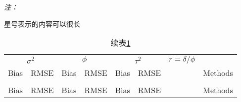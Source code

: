 \documentclass[
]{ctexbook}
\begin{document}
\begin{ThreePartTable}
\begin{TableNotes}
\item \textit{注：} 
\item * 星号表示的内容可以很长
\end{TableNotes}
\begin{longtable}[t]{rrrrrrrl}
\caption{\label{tab:kableExtra-latex}第1种类型的统计表格样式}\\
\toprule
\multicolumn{2}{c}{$\sigma^2$} & \multicolumn{2}{c}{$\phi$} & \multicolumn{2}{c}{$\tau^2$} & \multicolumn{1}{c}{$r=\delta/\phi$} & \multicolumn{1}{c}{ } \\
\cmidrule(l{3pt}r{3pt}){1-2} \cmidrule(l{3pt}r{3pt}){3-4} \cmidrule(l{3pt}r{3pt}){5-6} \cmidrule(l{3pt}r{3pt}){7-7}
Bias & RMSE & Bias & RMSE & Bias & RMSE &  & Methods\\
\midrule
\endfirsthead
\caption[]{续表\ref{tab:kableExtra-latex}}\\
\toprule
Bias & RMSE & Bias & RMSE & Bias & RMSE &  & Methods\\
\midrule
\endhead


\end{longtable}
\end{ThreePartTable}
\end{document}
